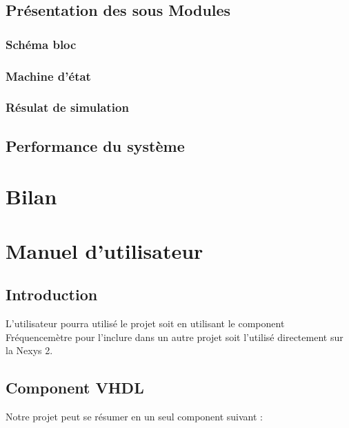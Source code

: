 \documentclass[a4paper,11pt]{article}
\begin{document}
\subsection{Présentation des sous Modules}
\subsubsection{Schéma bloc}
\subsubsection{Machine d'état}
\subsubsection{Résulat de simulation}

\subsection{Performance du système}

\newpage
\section{Bilan}

\newpage
\appendix
\section{Manuel d'utilisateur}
\subsection{Introduction}
L'utilisateur pourra utilisé le projet soit en utilisant le component Fréquencemètre pour l'inclure dans un autre projet soit l'utilisé directement sur la Nexys 2.

\subsection{Component VHDL}
Notre projet peut se résumer en un seul component suivant :
\end{document}
